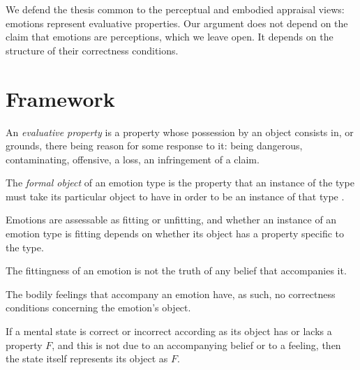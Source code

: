 \documentclass{situationist-preprint}
\begin{document}
We defend the thesis common to the perceptual and embodied appraisal views: emotions represent evaluative properties. Our argument does not depend on the claim that emotions are perceptions, which we leave open. It depends on the structure of their correctness conditions.

\section{Framework}\label{s:framework}

\begin{definition}\label{d:eval}
An \emph{evaluative property} is a property whose possession by an object consists in, or grounds, there being reason for some response to it: being dangerous, contaminating, offensive, a loss, an infringement of a claim.
\end{definition}

\begin{definition}\label{d:formal}
The \emph{formal object} of an emotion type is the property that an instance of the type must take its particular object to have in order to be an instance of that type \citep{Kenny1963}.
\end{definition}

\begin{principle}[Fittingness]\label{p:fit}
Emotions are assessable as fitting or unfitting, and whether an instance of an emotion type is fitting depends on whether its object has a property specific to the type.
\end{principle}

\begin{principle}\label{p:belief}
The fittingness of an emotion is not the truth of any belief that accompanies it.
\end{principle}

\begin{principle}\label{p:feel}
The bodily feelings that accompany an emotion have, as such, no correctness conditions concerning the emotion's object.
\end{principle}

\begin{assumption}\label{a:content}
If a mental state is correct or incorrect according as its object has or lacks a property $F$, and this is not due to an accompanying belief or to a feeling, then the state itself represents its object as $F$.
\end{assumption}
\end{document}
